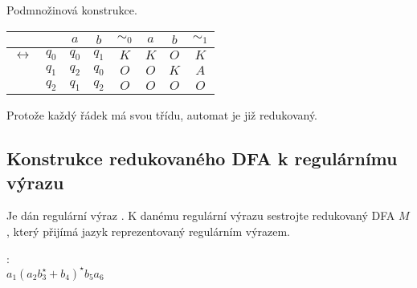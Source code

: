 Podmnožinová konstrukce.

\begin{tabular}{|r r|c c||c|c c||c|}
    \hline
    &  & $a$ & $b$ & $\sim_0$ & $a$ & $b$ & $\sim_1$ \\ \hline \hline
    $\leftrightarrow$&$q_0$ & $q_0$ & $q_1$ & $K$ & $K$ & $O$ & $K$\\
                    & $q_1$ & $q_2$ & $q_0$ & $O$ & $O$ & $K$ & $A$\\
                    & $q_2$ & $q_1$ & $q_2$ & $O$ & $O$ & $O$ & $O$\\
    \hline
\end{tabular} 
Protože každý řádek má svou třídu, automat je již redukovaný.

\newpage

\subsection{Konstrukce redukovaného DFA k regulárnímu výrazu}
Je dán regulární výraz . K danému regulární výrazu sestrojte redukovaný DFA $M$,
který přijímá jazyk reprezentovaný regulárním výrazem.

: \\$a_1(a_2 b_3^{\star} + b_4)^{\star} b_5 a_6$

